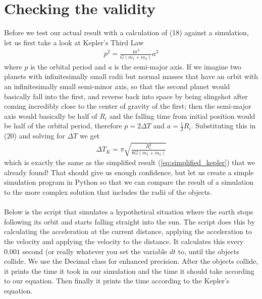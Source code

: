 \documentclass{article}
\begin{document}
\section{Checking the validity}
Before we test our actual result with a calculation of (18) against a simulation, let us first take a look at Kepler's Third Law
\begin{align}
    p^2 = \frac{4\pi^2}{G(m_1 + m_2)} a^3
\end{align}
where $p$ is the orbital period and $a$ is the semi-major axis. If we imagine two planets with infinitesimally small radii but normal masses that have an orbit with an infinitesimally small semi-minor axis, so that the second planet would basically fall into the first, and reverse back into space by being slingshot after coming incredibly close to the center of gravity of the first; then the semi-major axis would basically be half of $R_i$ and the falling time from initial position would be half of the orbital period, therefore $p = 2\Delta T$ and $a = \frac{1}{2}R_i$. Substituting this in (20) and solving for $\Delta T$ we get
\begin{align}
    \Delta T_{K} =  \pi \sqrt{\frac{R_i^3}{8G(m_1 + m_2)}}
\end{align}
which is exactly the same as the simplified result (\ref{eq:simplified_kepler}) that we already found! That should give us enough confidence, but let us create a simple simulation program in Python so that we can compare the result of a simulation to the more complex solution that includes the radii of the objects.\\
\\
Below is the script that simulates a hypothetical situation where the earth stops following its orbit and starts falling straight into the sun. The script does this by calculating the acceleration at the current distance, applying the acceleration to the velocity and applying the velocity to the distance. It calculates this every $0.001$ second (or really whatever you set the variable $dt$ to, until the objects collide. We use the Decimal class for enhanced precision. After the objects collide, it prints the time it took in our simulation and the time it should take according to our equation. Then finally it prints the time according to the Kepler's equation.
\end{document}
